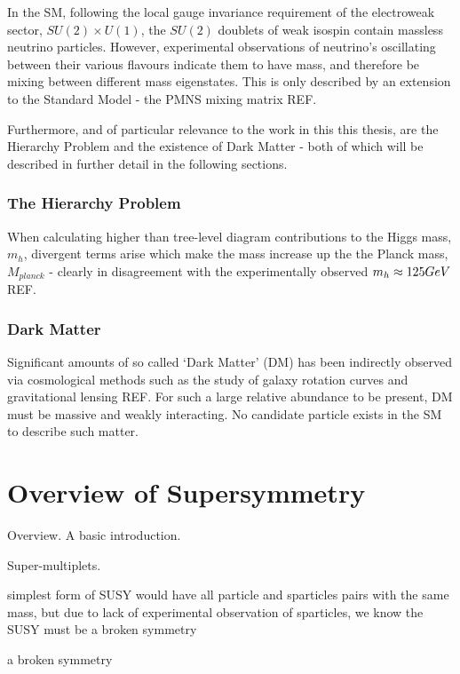 In the SM, following the local gauge invariance requirement of the electroweak
sector, $SU(2)\times U(1)$, the $SU(2)$ doublets of weak isospin contain
massless neutrino particles. However, experimental observations of neutrino's
oscillating between their various flavours indicate them to have mass, and
therefore be mixing between different mass eigenstates. This is only described
by an extension to the Standard Model - the PMNS mixing matrix REF.

Furthermore, and of particular relevance to the work in this this thesis, are
the Hierarchy Problem and the existence of Dark Matter - both of which will be
described in further detail in the following sections.

\subsubsection{The Hierarchy Problem}

When calculating higher than tree-level diagram contributions to the Higgs mass,
$m_h$, divergent terms arise which make the mass increase up the the Planck
mass, $M_{planck}$ - clearly in disagreement with the experimentally observed
$m_h \approx 125 GeV$ REF.

\subsubsection{Dark Matter}
Significant amounts of so called `Dark Matter' (DM) has been indirectly observed
via cosmological methods such as the study of galaxy rotation curves and
gravitational lensing REF. For such a large relative abundance to be present, DM
must be massive and weakly interacting. No candidate particle exists in the SM
to describe such matter.

\section{Overview of Supersymmetry}  %
\label{sec:theory_overview}
Overview. A basic introduction.

Super-multiplets.

simplest form of SUSY would have all particle and sparticles pairs with the same
mass, but due to lack of experimental observation of sparticles, we know the
SUSY must be a broken symmetry

a broken symmetry

